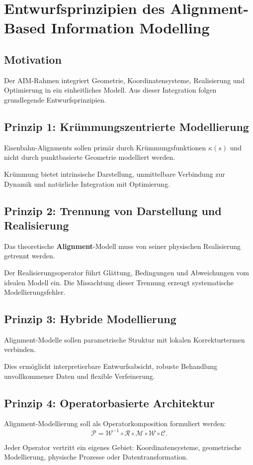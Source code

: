 \section{Entwurfsprinzipien des Alignment-Based Information Modelling}
\subsection*{Motivation}
Der AIM-Rahmen integriert Geometrie, Koordinatensysteme, Realisierung und
Optimierung in ein einheitliches Modell. Aus dieser Integration folgen
grundlegende Entwurfsprinzipien.

\subsection{Prinzip 1: Krümmungszentrierte Modellierung}
\begin{proposition}
Eisenbahn-Alignments sollen primär durch Krümmungsfunktionen \(\kappa(s)\) und
nicht durch punktbasierte Geometrie modelliert werden.
\end{proposition}
Krümmung bietet intrinsische Darstellung, unmittelbare Verbindung zur Dynamik
und natürliche Integration mit Optimierung.

\subsection{Prinzip 2: Trennung von Darstellung und Realisierung}
\begin{proposition}
Das theoretische \textbf{Alignment}-Modell muss von seiner physischen
Realisierung getrennt werden.
\end{proposition}
Der Realisierungsoperator führt Glättung, Bedingungen und Abweichungen vom
idealen Modell ein. Die Missachtung dieser Trennung erzeugt systematische
Modellierungsfehler.

\subsection{Prinzip 3: Hybride Modellierung}
\begin{proposition}
Alignment-Modelle sollen parametrische Struktur mit lokalen Korrekturtermen
verbinden.
\end{proposition}
Dies ermöglicht interpretierbare Entwurfsabsicht, robuste Behandlung
unvollkommener Daten und flexible Verfeinerung.

\subsection{Prinzip 4: Operatorbasierte Architektur}
\begin{proposition}
Alignment-Modellierung soll als Operatorkomposition formuliert werden:
\[
\mathcal P=\mathcal W^{-1}\circ\mathcal R\circ\mathcal M\circ\mathcal W\circ\mathcal C.
\]
\end{proposition}
Jeder Operator vertritt ein eigenes Gebiet: Koordinatensysteme, geometrische
Modellierung, physische Prozesse oder Datentransformation.

